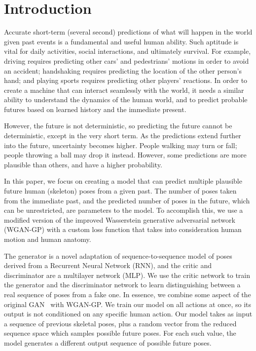 \documentclass[10pt,twocolumn,letterpaper]{article}
\begin{document}
\section{Introduction}

Accurate short-term (several second) predictions of what will happen in the world given past events is a fundamental and useful human ability. Such aptitude is vital for daily activities, social interactions, and ultimately survival. For example, driving requires predicting other cars' and pedestrians' motions in order to avoid an accident; handshaking requires predicting the location of the other person's hand; and playing sports requires predicting other players' reactions. In order to create a machine that can interact seamlessly with the world, it needs a similar ability to understand the dynamics of the human world, and to predict probable futures based on learned history and the immediate present.

However, the future is not deterministic, so predicting the future cannot be deterministic, except in the very short term. As the predictions extend further into the future, uncertainty becomes higher. People walking may turn or fall; people throwing a ball may drop it instead.  However, some predictions are more plausible than others, and have a higher probability.

In this paper, we focus on creating a model that can predict multiple plausible future human (skeleton) poses from a given past. The number of poses taken from the immediate past, and the predicted number of poses in the future, which can be unrestricted, are parameters to the model. To accomplish this, we use a modified version of the improved Wasserstein generative adversarial network (WGAN-GP)\cite{corr2017:Ishaan} with a custom loss function that takes into consideration human motion and human anatomy.

The generator is a novel adaptation of sequence-to-sequence model\cite{nips2014:Ilya} of poses derived from a Recurrent Neural Network (RNN), and the critic and discriminator are a multilayer network (MLP). We use the critic network to train the generator and the discriminator network to learn distinguishing between a real sequence of poses from a fake one. In essence, we combine some aspect of the original GAN~\cite{nips2014:Goodfellow} with WGAN-GP\cite{corr2017:Ishaan}. We train our model on all actions at once, so its output is not conditioned on any specific human action. Our model takes as input a sequence of previous skeletal poses, plus a random vector  from the reduced sequence space which samples possible future poses. For each such  value, the model generates a different output sequence of possible future poses.
\end{document}
